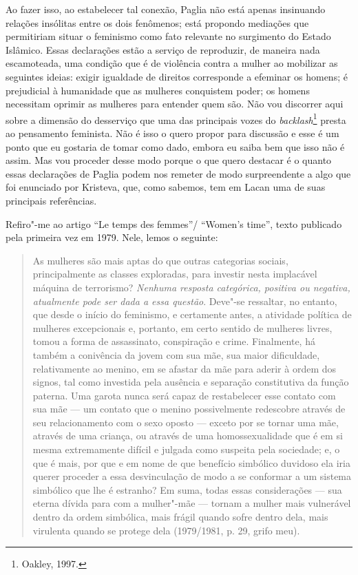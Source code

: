 Ao fazer isso, ao estabelecer tal conexão, Paglia não está apenas
insinuando relações insólitas entre os dois fenômenos; está propondo
mediações que permitiriam situar o feminismo como fato relevante no
surgimento do Estado Islâmico. Essas declarações estão a serviço de
reproduzir, de maneira nada escamoteada, uma condição que é de violência
contra a mulher ao mobilizar as seguintes ideias: exigir igualdade de
direitos corresponde a efeminar os homens; é prejudicial à humanidade
que as mulheres conquistem poder; os homens necessitam oprimir as
mulheres para entender quem são. Não vou discorrer aqui sobre a dimensão
do desserviço que uma das principais vozes do \emph{backlash}\footnote{Oakley,
  1997.} presta ao pensamento feminista. Não é isso o quero propor para
discussão e esse é um ponto que eu gostaria de tomar como dado, embora
eu saiba bem que isso não é assim. Mas vou proceder desse modo porque o
que quero destacar é o quanto essas declarações de Paglia podem nos
remeter de modo surpreendente a algo que foi enunciado por Kristeva,
que, como sabemos, tem em Lacan uma de suas principais referências.

Refiro"-me ao artigo ``Le temps des femmes''/ ``Women's time'', texto
publicado pela primeira vez em 1979. Nele, lemos o seguinte:

\begin{quote}
As mulheres são mais aptas do que outras categorias sociais,
principalmente as classes exploradas, para investir nesta implacável
máquina de terrorismo? \emph{Nenhuma resposta categórica, positiva ou
negativa, atualmente pode ser dada a essa questão}. Deve"-se ressaltar,
no entanto, que desde o início do feminismo, e certamente antes, a
atividade política de mulheres excepcionais e, portanto, em certo
sentido de mulheres livres, tomou a forma de assassinato, conspiração e
crime. Finalmente, há também a conivência da jovem com sua mãe, sua
maior dificuldade, relativamente ao menino, em se afastar da mãe para
aderir à ordem dos signos, tal como investida pela ausência e separação
constitutiva da função paterna. Uma garota nunca será capaz de
restabelecer esse contato com sua mãe --- um contato que o menino
possivelmente redescobre através de seu relacionamento com o sexo oposto
--- exceto por se tornar uma mãe, através de uma criança, ou através de
uma homossexualidade que é em si mesma extremamente difícil e julgada
como suspeita pela sociedade; e, o que é mais, por que e em nome de que
benefício simbólico duvidoso ela iria querer proceder a essa
desvinculação de modo a se conformar a um sistema simbólico que lhe é
estranho? Em suma, todas essas considerações --- sua eterna dívida para
com a mulher"-mãe --- tornam a mulher mais vulnerável dentro da ordem
simbólica, mais frágil quando sofre dentro dela, mais virulenta quando
se protege dela (1979/1981, p. 29, grifo meu).
\end{quote}

